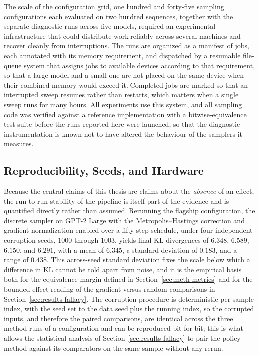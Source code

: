 The scale of the configuration grid, one hundred and forty-five sampling configurations each evaluated on two hundred sequences, together with the separate diagnostic runs across five models, required an experimental infrastructure that could distribute work reliably across several machines and recover cleanly from interruptions. The runs are organized as a manifest of jobs, each annotated with its memory requirement, and dispatched by a resumable file-queue system that assigns jobs to available devices according to that requirement, so that a large model and a small one are not placed on the same device when their combined memory would exceed it. Completed jobs are marked so that an interrupted sweep resumes rather than restarts, which matters when a single sweep runs for many hours. All experiments use this system, and all sampling code was verified against a reference implementation with a bitwise-equivalence test suite before the runs reported here were launched, so that the diagnostic instrumentation is known not to have altered the behaviour of the samplers it measures.

\subsection{Reproducibility, Seeds, and Hardware}
\label{sec:meth-repro}

Because the central claims of this thesis are claims about the \emph{absence} of an effect, the run-to-run stability of the pipeline is itself part of the evidence and is quantified directly rather than assumed. Rerunning the flagship configuration, the discrete sampler on GPT-2 Large with the Metropolis--Hastings correction and gradient normalization enabled over a fifty-step schedule, under four independent corruption seeds, $1000$ through $1003$, yields final KL divergences of $6.348$, $6.589$, $6.150$, and $6.291$, with a mean of $6.345$, a standard deviation of $0.183$, and a range of $0.438$.
This across-seed standard deviation fixes the scale below which a difference in KL cannot be told apart from noise, and it is the empirical basis both for the equivalence margin defined in Section~\ref{sec:meth-metrics} and for the bounded-effect reading of the gradient-versus-random comparisons in Section~\ref{sec:results-fallacy}. The corruption procedure is deterministic per sample index, with the seed set to the data seed plus the running index, so the corrupted inputs, and therefore the paired comparisons, are identical across the three method runs of a configuration and can be reproduced bit for bit; this is what allows the statistical analysis of Section~\ref{sec:results-fallacy} to pair the policy method against its comparators on the same sample without any rerun.


